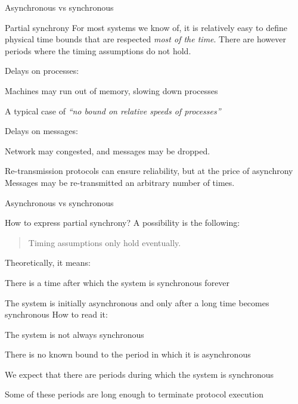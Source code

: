 \begin{frame}{Asynchronous vs synchronous}

\begin{block}{Partial synchrony}
For most systems we know of, it is relatively easy to define physical time bounds that
are respected {\em most of the time}. There are however periods where the timing assumptions
do not hold.
\end{block}

\BIL
\item Delays on processes:
\BI
\item Machines may run out of memory, slowing down processes
\item A typical case of {\em ``no bound on relative speeds of processes''}
\EI

\item Delays on messages:
\BI
\item Network may congested, and messages may be dropped.
\item Re-transmission protocols can ensure reliability, but at the price of asynchrony\\
  Messages may be re-transmitted an arbitrary number of times.
\EI
\EIL
{}

\end{frame}

\begin{frame}{Asynchronous vs synchronous}
	
How to express partial synchrony? A possibility is the following:
\begin{quote}
  Timing assumptions only hold \alert{eventually}.
\end{quote}
\alert{Theoretically, it means:}
\BI
\item There is a time after which the system is synchronous forever
\item The system is initially asynchronous and only after a long time becomes synchronous
\EI
\alert{How to read it:}
\BI
\item The system is not always synchronous
\item There is no known bound to the period in which it is asynchronous
\item We expect that there are periods during which the system is synchronous
\item Some of these periods are long enough to terminate protocol execution
\EI
\end{frame}

\begin{RMFrame}

\BI
\item {}
\EI

\end{RMFrame}



 
